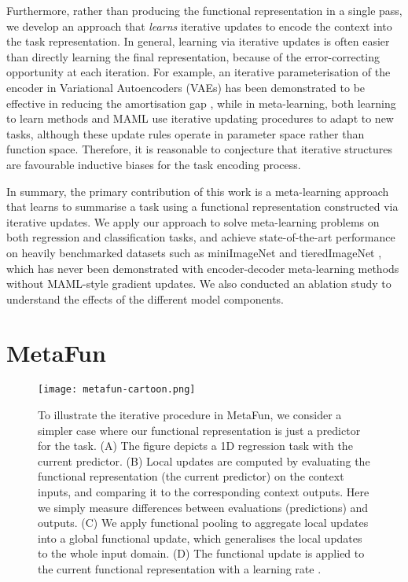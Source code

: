 \documentclass{article}
\theoremstyle{definition}
\begin{document}
Furthermore, rather than producing the functional representation in a single pass, we develop an approach that \textit{learns} iterative updates to encode the context into the task representation.
In general, learning via iterative updates is often easier than directly learning the final representation, because of the error-correcting opportunity at each iteration. 
For example, an iterative parameterisation of the encoder in Variational Autoencoders (VAEs) has been demonstrated to be effective in reducing the amortisation gap \citep{marino2018iterative}, 
while in meta-learning, both learning to learn methods \citep{andrychowicz2016learning,ravi2016optimization} and \gls{MAML} \citep{finn2017model} use iterative updating procedures to adapt to new tasks, although these update rules operate in parameter space rather than function space.
Therefore, it is reasonable to conjecture that iterative structures are favourable inductive biases for the task encoding process.


In summary,
the primary contribution of this work is a meta-learning approach that learns to summarise a task using a functional representation constructed via iterative updates. 
We apply our approach to solve  meta-learning problems on both regression and classification tasks, and achieve state-of-the-art performance on heavily benchmarked datasets such as miniImageNet \citep{vinyals2016matching} and tieredImageNet \citep{ren2018meta}, which has never been demonstrated with encoder-decoder meta-learning methods without \gls{MAML}-style gradient updates.
We also conducted an ablation study to understand the effects of the different model components.

\section{MetaFun} \label{sec:metafun}

\begin{figure}
  \centering
    \texttt{[image: metafun-cartoon.png]}
\caption{To illustrate the iterative procedure in MetaFun, we consider a simpler case where our functional representation is just a predictor for the task. (A) The figure depicts a 1D regression task with the current predictor. (B) Local updates are computed by evaluating the functional representation (the current predictor) on the context inputs, and comparing it to the corresponding context outputs. Here we simply measure differences between evaluations (predictions) and outputs. (C) We apply functional pooling to aggregate local updates into a global functional update, which generalises the local updates to the whole input domain. (D) The functional update is applied to the current functional representation with a learning rate .}
\label{fig:cartoon}
\end{figure}
\end{document}
